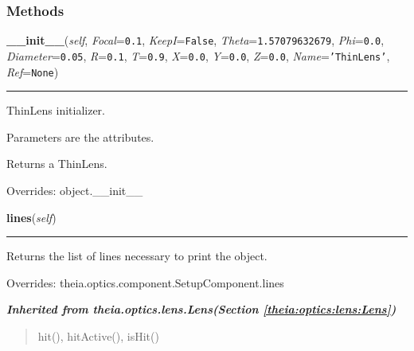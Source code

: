   \subsubsection{Methods}

    \vspace{0.5ex}

\hspace{.8\funcindent}\begin{boxedminipage}{\funcwidth}

    \raggedright \textbf{\_\_init\_\_}(\textit{self}, \textit{Focal}={\tt 0.1}, \textit{KeepI}={\tt False}, \textit{Theta}={\tt 1.57079632679}, \textit{Phi}={\tt 0.0}, \textit{Diameter}={\tt 0.05}, \textit{R}={\tt 0.1}, \textit{T}={\tt 0.9}, \textit{X}={\tt 0.0}, \textit{Y}={\tt 0.0}, \textit{Z}={\tt 0.0}, \textit{Name}={\tt \texttt{'}\texttt{ThinLens}\texttt{'}}, \textit{Ref}={\tt None})

    \vspace{-1.5ex}

    \rule{\textwidth}{0.5\fboxrule}
\setlength{\parskip}{2ex}
    ThinLens initializer.

    Parameters are the attributes.

    Returns a ThinLens.

\setlength{\parskip}{1ex}
      Overrides: object.\_\_init\_\_

    \end{boxedminipage}

    \vspace{0.5ex}

\hspace{.8\funcindent}\begin{boxedminipage}{\funcwidth}

    \raggedright \textbf{lines}(\textit{self})

    \vspace{-1.5ex}

    \rule{\textwidth}{0.5\fboxrule}
\setlength{\parskip}{2ex}
    Returns the list of lines necessary to print the object.

\setlength{\parskip}{1ex}
      Overrides: theia.optics.component.SetupComponent.lines

    \end{boxedminipage}


\large{\textbf{\textit{Inherited from theia.optics.lens.Lens\textit{(Section \ref{theia:optics:lens:Lens})}}}}

\begin{quote}
hit(), hitActive(), isHit()
\end{quote}

